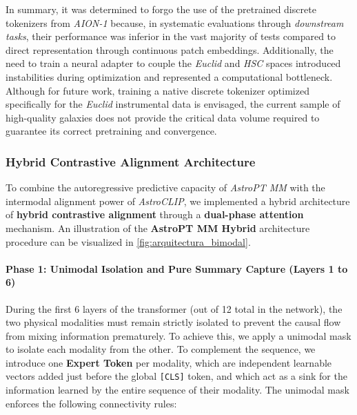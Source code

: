 In summary, it was determined to forgo the use of the pretrained discrete tokenizers from \textit{AION-1} because, in systematic evaluations through \textit{downstream tasks}, their performance was inferior in the vast majority of tests compared to direct representation through continuous patch embeddings. Additionally, the need to train a neural adapter to couple the \textit{Euclid} and \textit{\gls{HSC}} spaces introduced instabilities during optimization and represented a computational bottleneck. Although for future work, training a native discrete tokenizer optimized specifically for the \textit{Euclid} instrumental data is envisaged, the current sample of high-quality galaxies does not provide the critical data volume required to guarantee its correct pretraining and convergence.
\subsubsection{Hybrid Contrastive Alignment Architecture} \label{sec:dev:hyb}

To combine the autoregressive predictive capacity of \textit{AstroPT MM} with the intermodal alignment power of \textit{AstroCLIP}, we implemented a hybrid architecture of \textbf{hybrid contrastive alignment} through a \textbf{dual-phase attention} mechanism. An illustration of the \textbf{AstroPT MM Hybrid} architecture procedure can be visualized in \cref{fig:arquitectura_bimodal}.


\paragraph{Phase 1: Unimodal Isolation and Pure Summary Capture (Layers 1 to 6)}

During the first 6 layers of the transformer (out of 12 total in the network), the two physical modalities must remain strictly isolated to prevent the causal flow from mixing information prematurely. To achieve this, we apply a unimodal mask to isolate each modality from the other. To complement the sequence, we introduce one \textbf{Expert Token} per modality, which are independent learnable vectors added just before the global \texttt{[CLS]} token, and which act as a sink for the information learned by the entire sequence of their modality. The unimodal mask enforces the following connectivity rules:

